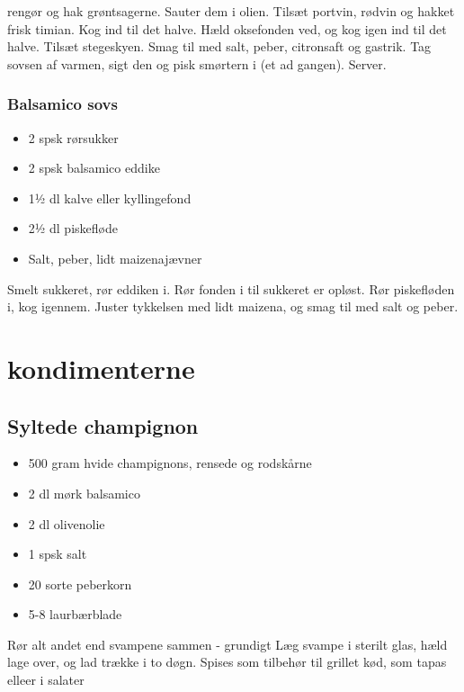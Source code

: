 \documentclass[
]{book}
\providecommand{\tightlist}{%
  \setlength{\itemsep}{0pt}\setlength{\parskip}{0pt}}
\begin{document}
rengør og hak grøntsagerne.
Sauter dem i olien.
Tilsæt portvin, rødvin og hakket frisk timian. Kog ind til det halve.
Hæld oksefonden ved, og kog igen ind til det halve. Tilsæt stegeskyen.
Smag til med salt, peber, citronsaft og gastrik.
Tag sovsen af varmen, sigt den og pisk smørtern i (et ad gangen). Server.

\hypertarget{balsamico-sovs}{%
\subsection{Balsamico sovs}\label{balsamico-sovs}}

\begin{itemize}
\tightlist
\item
  2 spsk rørsukker
\item
  2 spsk balsamico eddike
\item
  1½ dl kalve eller kyllingefond
\item
  2½ dl piskefløde
\item
  Salt, peber, lidt maizenajævner
\end{itemize}

Smelt sukkeret, rør eddiken i. Rør fonden i til sukkeret er opløst. Rør piskefløden i, kog igennem. Juster tykkelsen med lidt maizena, og smag til med salt og peber.

\hypertarget{kondimenterne}{%
\chapter{kondimenterne}\label{kondimenterne}}

\hypertarget{syltede-champignon}{%
\section{Syltede champignon}\label{syltede-champignon}}

\begin{itemize}
\tightlist
\item
  500 gram hvide champignons, rensede og rodskårne
\item
  2 dl mørk balsamico
\item
  2 dl olivenolie
\item
  1 spsk salt
\item
  20 sorte peberkorn
\item
  5-8 laurbærblade
\end{itemize}

Rør alt andet end svampene sammen - grundigt
Læg svampe i sterilt glas, hæld lage over, og lad trække i
to døgn. Spises som tilbehør til grillet kød, som tapas elleer
i salater
\end{document}
